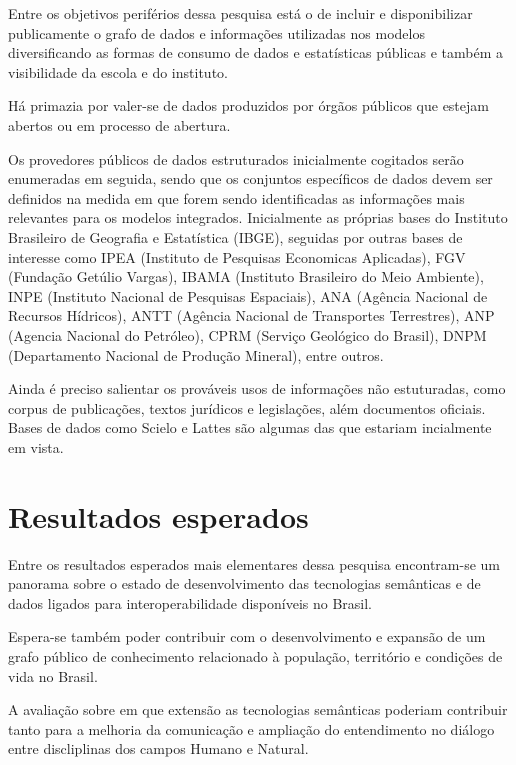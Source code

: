 \documentclass[
	11pt,				%
	openany,			%
	oneside,			%
	a4paper,			%
	english,			%
	french,				%
	spanish,			%
	brazil,				%
	]{abntex2}
\begin{document}
Entre os objetivos periférios dessa pesquisa está o de incluir e disponibilizar publicamente o grafo de dados e informações utilizadas nos modelos diversificando as formas de consumo de dados e estatísticas públicas e também a visibilidade da escola e do instituto.

Há primazia por valer-se de dados produzidos por órgãos públicos que estejam abertos ou em processo de abertura.

Os provedores públicos de dados estruturados inicialmente cogitados serão enumeradas em seguida, sendo que os conjuntos específicos de dados devem ser definidos na medida em que forem sendo identificadas as informações mais relevantes para os modelos integrados. Inicialmente as próprias bases do Instituto Brasileiro de Geografia e Estatística (IBGE), seguidas por outras bases de interesse como IPEA (Instituto de Pesquisas Economicas Aplicadas), FGV (Fundação Getúlio Vargas), IBAMA (Instituto Brasileiro do Meio Ambiente), INPE (Instituto Nacional de Pesquisas Espaciais), ANA (Agência Nacional de Recursos Hídricos), ANTT (Agência Nacional de Transportes Terrestres), ANP (Agencia Nacional do Petróleo), CPRM (Serviço Geológico do Brasil), DNPM (Departamento Nacional de Produção Mineral), entre outros.

Ainda é preciso salientar os prováveis usos de informações não estuturadas, como corpus de publicações, textos jurídicos e legislações, além documentos oficiais. Bases de dados como Scielo e Lattes são algumas das que estariam incialmente em vista.

\chapter{Resultados esperados}

Entre os resultados esperados mais elementares dessa pesquisa encontram-se um panorama sobre o estado de desenvolvimento das tecnologias semânticas e de dados ligados para interoperabilidade disponíveis no Brasil.

Espera-se também poder contribuir com o desenvolvimento e expansão de um grafo público de conhecimento relacionado à população, território e condições de vida no Brasil.

A avaliação sobre em que extensão as tecnologias semânticas poderiam contribuir tanto para a melhoria da comunicação e ampliação do entendimento no diálogo entre discliplinas dos campos Humano e Natural.
\end{document}
